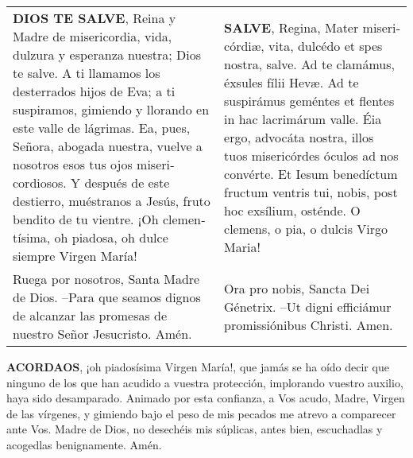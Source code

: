 \documentclass[./rosary.tex]{subfiles}
\begin{document}
\label{hailMaryQueen}
\begin{longtable} { p{} p{} }
    \textbf{DIOS TE SALVE}, Reina y Madre de mi­se­ri­cordia, vida, dulzura y esperanza nuestra; Dios te salve.
    A ti llamamos los desterrados hijos de Eva; a ti suspiramos, gimiendo y llorando en este valle de lágrimas.
    Ea, pues, Señora, abogada nuestra, vuelve a nosotros esos tus ojos mi­se­ri­cordiosos. Y después de este destierro, muéstranos a Jesús,
    fruto bendito de tu vientre. ¡Oh cle­men­tísima, oh piadosa, oh dulce siempre Virgen María!

     &

    \textbf{SALVE}, Regina, Mater mi­se­ri­córdiæ, vita, dulcédo et spes nostra, salve. Ad te clamámus, éxsules fílii Hevæ.
    Ad te suspirámus geméntes et flentes in hac lacrimárum valle. Éia ergo, advocáta nostra, illos tuos mi­se­ri­córdes óculos ad nos convérte.
    Et Iesum benedíctum fructum ventris tui, nobis, post hoc exsílium, osténde. O clemens, o pia, o dulcis Virgo Maria!            \\

    Ruega por nosotros, Santa Madre de Dios. --Para que seamos dignos de alcanzar las promesas de nuestro Señor Jesucristo. Amén.                                           
    
     & 
    
    Ora pro nobis, Sancta Dei Génetrix. --Ut digni efficiámur pro­mi­ssiónibus Christi. Amen.
\end{longtable}

\textbf{ACORDAOS}, ¡oh piadosísima Virgen María!, que jamás se ha oído decir que ninguno de los que han acudido a vuestra protección, 
implorando vuestro auxilio, haya sido desamparado. Animado por esta confianza, a Vos acudo, Madre, Virgen de las vírgenes, y gimiendo 
bajo el peso de mis pecados me atrevo a comparecer ante Vos. Madre de Dios, no desechéis mis súplicas, antes bien, escuchadlas y 
acogedlas benignamente. Amén.
\end{document}

